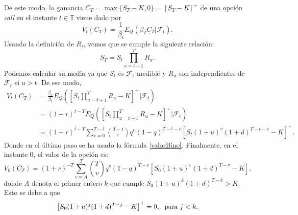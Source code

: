 De este modo, la ganancia $ C_T = \max\{S_T-K, 0\} = \left[S_T - K\right]^+$ de una opción \textit{call} en el instante $ t \in \mathbb{T} $ viene dado por
\[
V_t(C_T) = \frac{1}{\beta_t} E_Q(\beta_T C_T | \mathcal{F}_t).
\]
Usando la definición de $ R_t $, vemos que se cumple la siguiente relación:
\[
S_T = S_t \prod_{u = t+1}^{T}R_u.
\]
Podemos calcular su media ya que $ S_t $ es $ \mathcal{F}_t $-medible y $ R_u $ son independientes de $ \mathcal{F}_t $ si $ u > t $. De ese modo,
\begin{equation*}
\begin{split}
V_t (C_T) &= \frac{\beta_T}{\beta_t}E_Q(\left[S_t\prod_{u=t+1}^{T}R_u - K\right]^+ | \mathcal{F}_t) \\
&= (1+r)^{t-T} E_Q(\left[S_t\prod_{u=t+1}^{T}R_u - K\right]^+| \mathcal{F}_t) \\
& = (1+r)^{t-T} \sum_{v=0}^{T-t}\binom{T-t}{v}q^v(1-q)^{T-t-v}\left[S_t(1+u)^v(1+d)^{T-t-v}-K\right]^+.
\end{split}
\end{equation*}
Donde en el último paso se ha usado la fórmula \eqref{valorBino}. Finalmente, en el instante 0, el valor de la opción es:
\begin{equation*}
V_0(C_T) = (1+r)^{-T} \sum_{v=A}^{T}\binom{T}{v}q^v(1-q)^{T-v}\left[S_0(1+u)^v(1+d)^{T-v}-K\right],
\end{equation*}
donde $ A $ denota el primer entero $ k $ que cumple $ S_0(1+u)^k(1+d)^{T-k} > K $. Esto se debe a que \[\left[S_0(1+u)^j(1+d)^{T-j}-K\right]^+ = 0, \hspace{1mm}\text{ para } j<k.\]